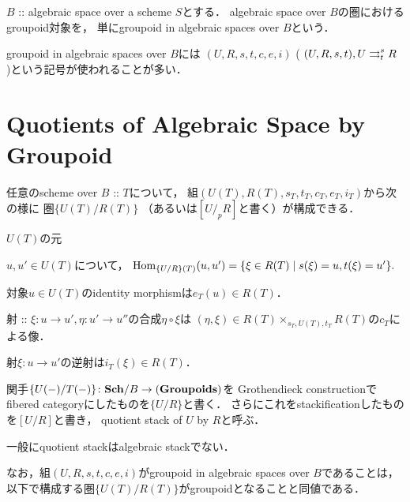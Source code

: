 \begin{Def}
    $B$ :: algebraic space over a scheme $S$とする．
    algebraic space over $B$の圏におけるgroupoid対象を，
    単にgroupoid in algebraic spaces over $B$という．
\end{Def}

groupoid in algebraic spaces over $B$には
$(U, R, s,t,c,e,i)$ ( $(U, R, s,t), U \mathrel{\mathop{\rightrightarrows}^{s}_{t}} R$ )という記号が使われることが多い．

\section{Quotients of Algebraic Space by Groupoid}
\begin{Def}
    任意のscheme over $B$ :: $T$について，
    組$(U(T), R(T), s_T, t_T, c_T, e_T, i_T)$から次の様に
    圏$\{U(T)/R(T)\}$ （あるいは$[U/_pR]$と書く）が構成できる．
    \begin{description}[labelindent=0.5cm, leftmargin=1.5cm]
        \item[Object] \mnewline
            $U(T)$の元

        \item[Arrow] \mnewline
            $u, u' \in U(T)$について，
            $\operatorname{Hom}_{\{U/R\}(T)}(u, u')=\{\xi \in R(T) \mid s(\xi)=u, t(\xi)=u' \}.$

        \item[Identity Morphism] \mnewline
            対象$u \in U(T)$のidentity morphismは$e_T(u) \in R(T)$．

        \item[Composition of Morphisms] \mnewline
            射 :: $\xi \colon u \to u', \eta \colon u' \to u''$の合成$\eta \circ \xi$は
            $(\eta, \xi) \in R(T) \times_{s_T, U(T), t_T} R(T)$の$c_T$による像．

        \item[Inverse Morphism] \mnewline
            射$\xi \colon u \to u'$の逆射は$i_T(\xi) \in R(T)$．
    \end{description}

    関手$\{U(-)/T(-)\} \colon \mathbf{Sch}/B \to (\mathbf{Groupoids})$を
    Grothendieck constructionでfibered categoryにしたものを$\{U/R\}$と書く．
    さらにこれをstackificationしたものを$[U/R]$と書き，
    quotient stack of $U$ by $R$と呼ぶ．
\end{Def}

一般にquotient stackはalgebraic stackでない．

なお，組$(U,R,s,t,c,e,i)$がgroupoid in algebraic spaces over $B$であることは，
以下で構成する圏$\{U(T)/R(T)\}$がgroupoidとなることと同値である．

